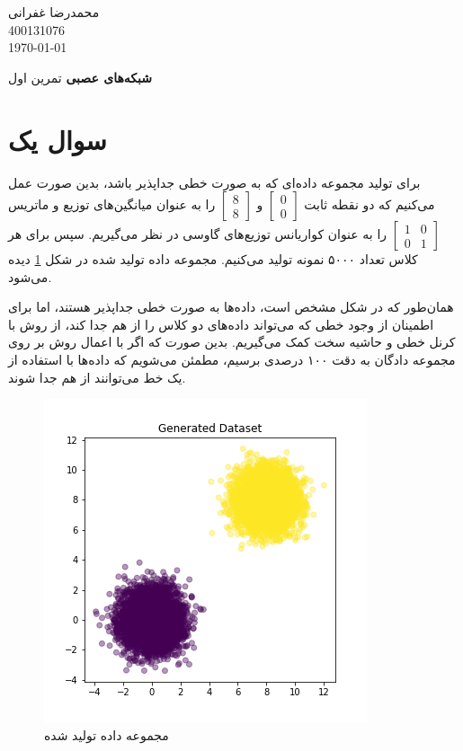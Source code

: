 \documentclass[12pt, a4paper]{article}
\newcommand{\coursetitle}{شبکه‌های عصبی}
\newcommand{\doctitle}{تمرین اول}
\newcommand{\name}{محمدرضا غفرانی}
\newcommand{\studentno}{400131076}
\newcommand{\todaydate}{\today}
\begin{document}
\begin{flushleft}
    \name \\
    \studentno \\
    \todaydate
\end{flushleft}

\begin{center}
    \huge
    \textbf{\coursetitle}
    \break
    \large
    \doctitle
\end{center}

\thispagestyle{plain}

\noindent

\section*{سوال یک}

برای تولید مجموعه داده‌ای که به صورت خطی جداپذیر باشد، بدین صورت عمل می‌کنیم که دو نقطه
ثابت $\begin{bmatrix}0\\0\end{bmatrix}$ و $\begin{bmatrix}8\\8\end{bmatrix}$
را به عنوان میانگین‌های توزیع و ماتریس $\begin{bmatrix}1&0\\0&1\end{bmatrix}$ را به عنوان کواریانس
توزیع‌های گاوسی در نظر می‌گیریم. سپس برای هر کلاس تعداد ۵۰۰۰ نمونه تولید می‌کنیم.
مجموعه داده تولید شده در شکل \ref{linear_separable_dataset} دیده می‌شود.

همان‌طور که در شکل مشخص است، داده‌ها به صورت خطی جدا‌پذیر هستند، اما
برای اطمینان از وجود خطی که می‌تواند داده‌های دو کلاس را از هم جدا کند، از روش  با کرنل خطی و
حاشیه سخت کمک می‌گیریم. بدین صورت که اگر با اعمال روش  بر روی مجموعه دادگان به دقت
۱۰۰ درصدی برسیم، مطمئن می‌شویم که داده‌ها با استفاده از یک خط می‌توانند از هم جدا شوند.


\begin{figure}[h]
    \centering
    \includegraphics[scale=0.4]{images/dataset.png}
    \caption{مجموعه داده تولید شده}
    \label{linear_separable_dataset}
\end{figure}
\end{document}
